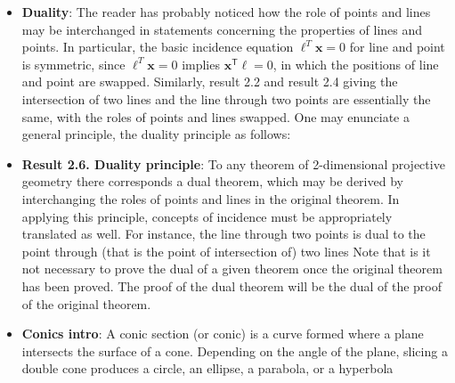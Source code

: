 \documentclass{report}
\begin{document}
\begin{itemize}
\begin{itemize}
                \item \textbf{Two planes intersect:} Two distinct planes through the origin intersect in a single line through the origin (which corresponds to one point in \(\mathbb{P}^{2}\), and consists of two opposite rays in \(\mathbb{R}^{3}\)).
            \end{itemize}
            Points and lines may be obtained by intersecting this set of rays and planes by the plane $x_{3}=1$. As illustrated in figure 2.1 the rays representing ideal points and the plane representing $\mathbf{\ell}_{\infty }$ are parallel to the plane $x_{3}=1$
            \bigbreak \noindent 
        \item \textbf{Duality}: The reader has probably noticed how the role of points and lines may be interchanged in statements concerning the properties of lines and points. In particular, the basic incidence equation $\mathbf{\ell}^{T}\mathbf{x} = 0$ for line and point is symmetric, since $\mathbf{\ell}^{T}\mathbf{x} = 0$ implies $\mathbf{x}^{\mathsf{T}}\mathbf{\ell}=0$, in which the positions of line and point are swapped.
            \bigbreak \noindent 
            Similarly, result 2.2 and result 2.4 giving the intersection of two lines and the line through two points are essentially the same, with the roles of points and lines swapped. One may enunciate a general principle, the duality principle as follows:
        \item \textbf{Result 2.6. Duality principle}: To any theorem of 2-dimensional projective geometry there corresponds a dual theorem, which may be derived by interchanging the roles of points and lines in the original theorem.
            \bigbreak \noindent 
            In applying this principle, concepts of incidence must be appropriately translated as well. For instance, the line through two points is dual to the point through (that is the point of intersection of) two lines
            \bigbreak \noindent 
            Note that is it not necessary to prove the dual of a given theorem once the original theorem has been proved. The proof of the dual theorem will be the dual of the proof of the original theorem.
        \item \textbf{Conics intro}: A conic section (or conic) is a curve formed where a plane intersects the surface of a cone. Depending on the angle of the plane, slicing a double cone produces a circle, an ellipse, a parabola, or a hyperbola
            \bigbreak \noindent 
            \bigbreak \noindent 

\end{itemize}
\end{document}
